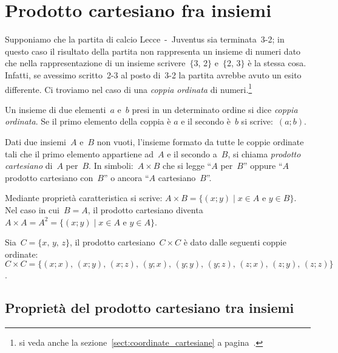 \ovalbox{\risolvii \ref{ese:\thechapter.68}, \ref{ese:\thechapter.69}, \ref{ese:\thechapter.70}, \ref{ese:\thechapter.71}}

\section{Prodotto cartesiano fra insiemi}

Supponiamo che la partita di calcio Lecce~-~Juventus sia terminata~3-2; in questo caso il risultato della partita
non rappresenta un insieme di numeri dato che nella rappresentazione di un insieme scrivere~$\{$3, 2$\}$ e~$\{$2, 3$\}$
 è la stessa cosa. Infatti, se avessimo scritto~2-3 al posto di~3-2 la partita avrebbe avuto un esito
differente. Ci troviamo nel caso di una \emph{coppia ordinata} di numeri.\footnote{si veda anche la sezione~\ref{sect:coordinate_cartesiane} a pagina~\pageref{sect:coordinate_cartesiane}.}

\begin{definizione}
Un insieme di due elementi~$a$ e~$b$
presi in un determinato ordine si dice \emph{coppia ordinata}. Se il primo elemento della coppia è
$a$ e il secondo è~$b$ si scrive:~$(a;b)$.
\end{definizione}

\begin{definizione}
Dati due insiemi~$A$ e~$B$ non vuoti,
l'insieme formato da tutte le coppie ordinate tali che
il primo elemento appartiene ad~$A$ e il secondo a~$B$, si chiama
\emph{prodotto cartesiano} di~$A$ per~$B$. In simboli:~$A\times B$ che si legge ``$A$ per~$B$''
oppure ``$A$ prodotto cartesiano con~$B$'' o ancora ``$A$ cartesiano~$B$''.
\end{definizione}

Mediante proprietà caratteristica si scrive:
$A\times B=\{(x;y)\mid x\in A\text{ e }y\in B\}$.
Nel caso in cui~$B=A$, il prodotto cartesiano diventa $A\times A=A^{2}=\{(x;y)\mid x\in A\text{ e }y\in A\}$.

\begin{exrig}
 \begin{esempio}
Sia~$C=\{x\text{, }y\text{, }z\}$, il prodotto cartesiano~$C\times C$ è dato dalle
seguenti coppie ordinate:~$C\times C=\{(x;x)\text{, }(x;y)\text{, }(x;z)\text{, }(y;x)\text{, }(y;y)\text{, }(y;z)\text{, }(z;x)\text{, }(z;y)\text{, }(z;z)\}$.
 \end{esempio}
\end{exrig}

\subsection{Proprietà del prodotto cartesiano tra insiemi}

